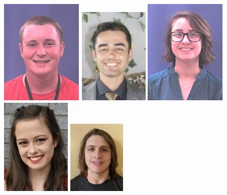 \documentclass[xcolor={usenames,dvipsnames,svgnames,table},12pt]{beamer}
\begin{document}
\begin{frame}{}
\begin{center}
\includegraphics[width=\photosize]{S21/000568140.jpg}
\includegraphics[width=\photosize]{S21/000572865.jpg}
\includegraphics[width=\photosize]{S21/000568255.jpg}
\includegraphics[width=\photosize]{S21/000572675.jpg}
\includegraphics[width=\photosize]{S21/000573492.jpg}

\end{center}
\end{frame}
\end{document}
